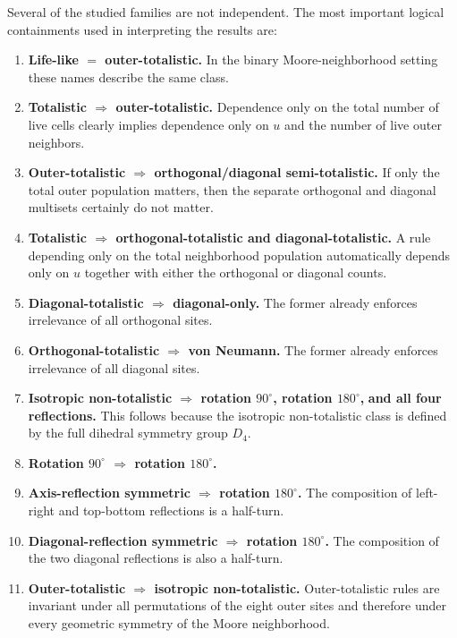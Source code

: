 \documentclass[11pt,a4paper]{article}
\begin{document}
Several of the studied families are not independent.  The most important logical containments
used in interpreting the results are:
\begin{enumerate}
\item \textbf{Life-like \(=\) outer-totalistic.}
      In the binary Moore-neighborhood setting these names describe the same class.
\item \textbf{Totalistic \(\Rightarrow\) outer-totalistic.}
      Dependence only on the total number of live cells clearly implies dependence only on
      \(u\) and the number of live outer neighbors.
\item \textbf{Outer-totalistic \(\Rightarrow\) orthogonal/diagonal semi-totalistic.}
      If only the total outer population matters, then the separate orthogonal and diagonal
      multisets certainly do not matter.
\item \textbf{Totalistic \(\Rightarrow\) orthogonal-totalistic and diagonal-totalistic.}
      A rule depending only on the total neighborhood population automatically depends only on
      \(u\) together with either the orthogonal or diagonal counts.
\item \textbf{Diagonal-totalistic \(\Rightarrow\) diagonal-only.}
      The former already enforces irrelevance of all orthogonal sites.
\item \textbf{Orthogonal-totalistic \(\Rightarrow\) von Neumann.}
      The former already enforces irrelevance of all diagonal sites.
\item \textbf{Isotropic non-totalistic \(\Rightarrow\) rotation \(90^\circ\), rotation \(180^\circ\),}
      \textbf{and all four reflections.}
      This follows because the isotropic non-totalistic class is defined by the full dihedral
      symmetry group \(D_4\).
\item \textbf{Rotation \(90^\circ\) \(\Rightarrow\) rotation \(180^\circ\).}
\item \textbf{Axis-reflection symmetric \(\Rightarrow\) rotation \(180^\circ\).}
      The composition of left-right and top-bottom reflections is a half-turn.
\item \textbf{Diagonal-reflection symmetric \(\Rightarrow\) rotation \(180^\circ\).}
      The composition of the two diagonal reflections is also a half-turn.
\item \textbf{Outer-totalistic \(\Rightarrow\) isotropic non-totalistic.}
      Outer-totalistic rules are invariant under all permutations of the eight outer sites and
      therefore under every geometric symmetry of the Moore neighborhood.

\end{enumerate}
\end{document}
